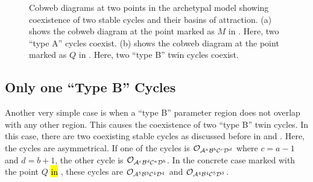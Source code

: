 \begin{figure}
	\centering
	\caption[Cobweb diagrams of the archetypal model showing coexistence of two cycles]{
		Cobweb diagrams at two points in the archetypal model showing coexistence of two stable cycles and their basins of attraction.
		(a) shows the cobweb diagram at the point marked as $M$ in .
		Here, two ``type A'' cycles coexist.
		(b) shows the cobweb diagram at the point marked as $Q$ in .
		Here, two ``type B'' twin cycles coexist.
	}
\end{figure}

\subsection{Only one ``Type B'' Cycles}

Another very simple case is when a ``type B'' parameter region does not overlap with any other region.
This causes the coexistence of two ``type B'' twin cycles.
In this case, there are two coexisting stable cycles as discussed before in  and .
Here, the cycles are asymmetrical.
If one of the cycles is $\mathcal{O}_{\mathcal{A}^a\mathcal{B}^b\mathcal{C}^c\mathcal{D}^d}$ where $c = a - 1$ and $d = b + 1$, the other cycle is $\mathcal{O}_{\mathcal{A}^c\mathcal{B}^d\mathcal{C}^a\mathcal{D}^b}$.
In the concrete case marked with the point $Q$ \hl{in} , these cycles are $\mathcal{O}_{\mathcal{A}^5\mathcal{B}^3\mathcal{C}^4\mathcal{D}^4}$ and $\mathcal{O}_{\mathcal{A}^4\mathcal{B}^4\mathcal{C}^5\mathcal{D}^3}$.

